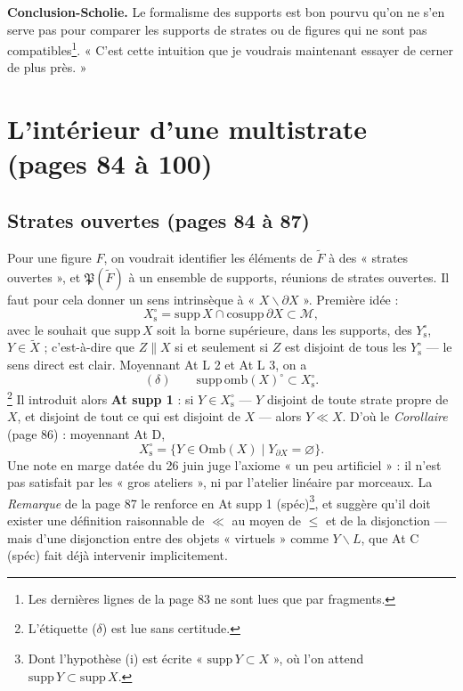 \documentclass[11pt,a4paper]{article}
\begin{document}
\textbf{Conclusion-Scholie.} Le formalisme des supports est bon pourvu qu'on ne
s'en serve pas pour comparer les supports de strates ou de figures qui ne sont
pas compatibles\footnote{Les dernières lignes de la page 83 ne sont lues que par
fragments.}. « C'est cette intuition que je voudrais maintenant essayer de cerner
de plus près. »

\section*{L'intérieur d'une multistrate (pages 84 à 100)}

\subsection*{Strates ouvertes (pages 84 à 87)}

Pour une figure $F$, on voudrait identifier les éléments de $\widetilde{F}$ à des
« strates ouvertes », et $\mathfrak{P}(\widetilde{F})$ à un ensemble de supports,
réunions de strates ouvertes. Il faut pour cela donner un sens intrinsèque à
« $X \smallsetminus \partial X$ ». Première idée :
\[
X^{\circ}_{\mathrm{s}} = \mathrm{supp}\, X \cap \mathrm{cosupp}\, \partial X
\subset \mathcal{M} ,
\]
avec le souhait que $\mathrm{supp}\, X$ soit la borne supérieure, dans les
supports, des $Y^{\circ}_{\mathrm{s}}$, $Y \in \widetilde{X}$ ; c'est-à-dire que
$Z \parallel X$ si et seulement si $Z$ est disjoint de tous les
$Y^{\circ}_{\mathrm{s}}$ --- le sens direct est clair. Moyennant At L 2 et At L 3,
on a
\[
(\delta) \qquad \mathrm{supp}\, \mathrm{omb}(X)^{\circ} \subset
X^{\circ}_{\mathrm{s}} .
\]
\footnote{L'étiquette ($\delta$) est lue sans certitude.}
Il introduit alors \textbf{At supp 1} : si $Y \in X^{\circ}_{\mathrm{s}}$ --- $Y$
disjoint de toute strate propre de $X$, et disjoint de tout ce qui est disjoint
de $X$ --- alors $Y \ll X$. D'où le \emph{Corollaire} (page 86) : moyennant At D,
\[
X^{\circ}_{\mathrm{s}} = \{Y \in \mathrm{Omb}(X) \mid Y_{\partial X} = \varnothing\}
.
\]
Une note en marge datée du 26 juin juge l'axiome « un peu artificiel » : il n'est
pas satisfait par les « gros ateliers », ni par l'atelier linéaire par morceaux.
La \emph{Remarque} de la page 87 le renforce en At supp 1 (spéc)\footnote{Dont
l'hypothèse (i) est écrite « $\mathrm{supp}\, Y \subset X$ », où l'on attend
$\mathrm{supp}\, Y \subset \mathrm{supp}\, X$.}, et suggère qu'il doit exister une
définition raisonnable de $\ll$ au moyen de $\leq$ et de la disjonction --- mais
d'une disjonction entre des objets « virtuels » comme $Y \smallsetminus L$, que
At C (spéc) fait déjà intervenir implicitement.
\end{document}
